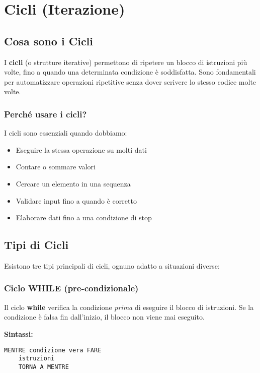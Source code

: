 \documentclass[a4paper,16pt]{article}
\begin{document}
\newpage
\section{Cicli (Iterazione)}

\subsection{Cosa sono i Cicli}

I \textbf{cicli} (o strutture iterative) permettono di ripetere un blocco di istruzioni più volte, fino a quando una determinata condizione è soddisfatta. Sono fondamentali per automatizzare operazioni ripetitive senza dover scrivere lo stesso codice molte volte.

\subsubsection{Perché usare i cicli?}

I cicli sono essenziali quando dobbiamo:
\begin{itemize}[leftmargin=*]
    \item Eseguire la stessa operazione su molti dati
    \item Contare o sommare valori
    \item Cercare un elemento in una sequenza
    \item Validare input fino a quando è corretto
    \item Elaborare dati fino a una condizione di stop
\end{itemize}

\subsection{Tipi di Cicli}

Esistono tre tipi principali di cicli, ognuno adatto a situazioni diverse:

\subsubsection{Ciclo WHILE (pre-condizionale)}

Il ciclo \textbf{while} verifica la condizione \textit{prima} di eseguire il blocco di istruzioni. Se la condizione è falsa fin dall'inizio, il blocco non viene mai eseguito.

\textbf{Sintassi:}
\begin{lstlisting}
MENTRE condizione vera FARE
    istruzioni
    TORNA A MENTRE
\end{lstlisting}
\end{document}
